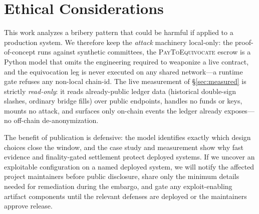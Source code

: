 \section*{Ethical Considerations}

This work analyzes a bribery pattern that could be harmful if applied to a production system. We
therefore keep the \emph{attack} machinery local-only: the proof-of-concept runs against synthetic
committees, the \textsc{PayToEquivocate} escrow is a Python model that omits the engineering required
to weaponize a live contract, and the equivocation leg is never executed on any shared network---a
runtime gate refuses any non-local chain-id. The live measurement of \S\ref{sec:measured} is strictly
\emph{read-only}: it reads already-public ledger data (historical double-sign slashes, ordinary bridge
fills) over public endpoints, handles no funds or keys, mounts no attack, and surfaces only on-chain
events the ledger already exposes---no off-chain de-anonymization.

The benefit of publication is defensive: the model identifies exactly which design choices close the
window, and the case study and measurement show why fast evidence and finality-gated settlement
protect deployed systems. If we uncover an exploitable configuration on a named deployed system, we
will notify the affected project maintainers before public disclosure, share only the minimum details
needed for remediation during the embargo, and gate any exploit-enabling artifact components until
the relevant defenses are deployed or the maintainers approve release.
